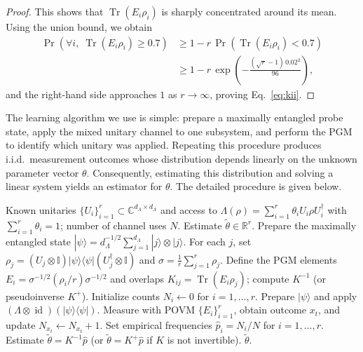 \documentclass[12pt]{article}
\begin{document}
\begin{proof}
This shows that $\operatorname{Tr}(E_i\rho_i)$ is sharply concentrated around its mean. 
Using the union bound, we obtain
\begin{equation}\label{eq:union}
\begin{split}
    \operatorname{Pr}\!\left(\forall i,\; \operatorname{Tr}(E_i\rho_i) \ge 0.7\right) 
    &\ge 1 - r\, \operatorname{Pr}\!\left(\operatorname{Tr}(E_i\rho_i) < 0.7\right) \\
    &\ge 1 - r\, \exp\!\left(-\frac{(\sqrt{r}-1)\,0.02^2}{96}\right),
\end{split}
\end{equation}
and the right-hand side approaches $1$ as $r \to \infty$, proving Eq.~\ref{eq:kii}.
\end{proof}

The learning algorithm we use is simple: prepare a maximally entangled probe state, apply the mixed unitary channel to one subsystem, and perform the PGM to identify which unitary was applied. Repeating this procedure produces i.i.d.\ measurement outcomes whose distribution depends linearly on the unknown parameter vector $\theta$. Consequently, estimating this distribution and solving a linear system yields an estimator for $\theta$. The detailed procedure is given below.

\begin{algorithm}[H]
\caption{PGM-based estimator for a mixed unitary channel}
\label{alg:pgm-mixed-unitary}
\begin{algorithmic}[1]
\Require Known unitaries $\{U_i\}_{i=1}^r \subset \mathbb{C}^{d_\Lambda \times d_\Lambda}$ and access to
$\Lambda(\rho) = \sum_{i=1}^r \theta_i U_i \rho U_i^\dagger$ with $\sum_{i=1}^r \theta_i = 1$; number of channel uses $N$.
\Ensure Estimate $\tilde{\theta} \in \mathbb{R}^r$.
\State Prepare the maximally entangled state
$|\psi\rangle = d_\Lambda^{-1/2} \sum_{j=1}^{d_\Lambda} |j\rangle \otimes |j\rangle$.
\State For each $j$, set $\rho_j = (U_j \otimes \mathbb{I})|\psi\rangle\langle\psi|(U_j^\dagger \otimes \mathbb{I})$ and
$\sigma = \frac{1}{r}\sum_{j=1}^r \rho_j$.
\State Define the PGM elements $E_i = \sigma^{-1/2}(\rho_i/r)\sigma^{-1/2}$ and overlaps
$K_{ij} = \operatorname{Tr}(E_i \rho_j)$; compute $K^{-1}$ (or pseudoinverse $K^+$).
\State Initialize counts $N_i \gets 0$ for $i = 1,\dots,r$.
    \State Prepare $|\psi\rangle$ and apply $(\Lambda \otimes \operatorname{id})(|\psi\rangle\langle\psi|)$.
    \State Measure with POVM $\{E_i\}_{i=1}^r$, obtain outcome $x_t$, and update $N_{x_t} \gets N_{x_t} + 1$.
\EndFor
\State Set empirical frequencies $\hat{p}_i = N_i/N$ for $i = 1,\dots,r$.
\State Estimate $\tilde{\theta} = K^{-1}\hat{p}$ (or $\tilde{\theta} = K^{+}\hat{p}$ if $K$ is not invertible).
\State \Return $\tilde{\theta}$.
\end{algorithmic}
\end{algorithm}
\end{document}
